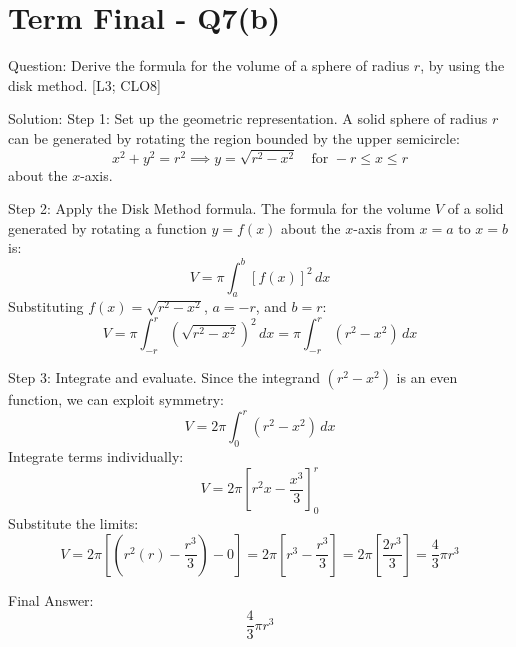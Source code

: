 \documentclass[11pt, a4paper]{article}
\begin{document}

\section*{Term Final - Q7(b)}

Question:
Derive the formula for the volume of a sphere of radius $r$, by using the disk method. [L3; CLO8]

Solution:
Step 1: Set up the geometric representation.
A solid sphere of radius $r$ can be generated by rotating the region bounded by the upper semicircle:
\[
x^2 + y^2 = r^2 \implies y = \sqrt{r^2 - x^2} \quad \text{for } -r \le x \le r
\]
about the $x$-axis.

Step 2: Apply the Disk Method formula.
The formula for the volume $V$ of a solid generated by rotating a function $y = f(x)$ about the $x$-axis from $x = a$ to $x = b$ is:
\[
V = \pi \int_{a}^{b} [f(x)]^2 \, dx
\]
Substituting $f(x) = \sqrt{r^2 - x^2}$, $a = -r$, and $b = r$:
\[
V = \pi \int_{-r}^{r} \left(\sqrt{r^2 - x^2}\right)^2 \, dx = \pi \int_{-r}^{r} (r^2 - x^2) \, dx
\]

Step 3: Integrate and evaluate.
Since the integrand $(r^2 - x^2)$ is an even function, we can exploit symmetry:
\[
V = 2\pi \int_{0}^{r} (r^2 - x^2) \, dx
\]
Integrate terms individually:
\[
V = 2\pi \left[ r^2 x - \frac{x^3}{3} \right]_{0}^{r}
\]
Substitute the limits:
\[
V = 2\pi \left[ \left( r^2(r) - \frac{r^3}{3} \right) - 0 \right] = 2\pi \left[ r^3 - \frac{r^3}{3} \right] = 2\pi \left[ \frac{2r^3}{3} \right] = \frac{4}{3}\pi r^3
\]

Final Answer:
\[
\boxed{\frac{4}{3}\pi r^3}
\]



\end{document}
